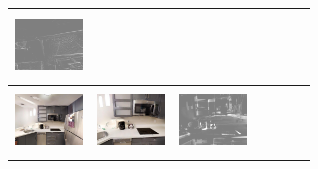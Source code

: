\documentclass[letterpaper, 10 pt, conference]{ieeeconf}  %
\begin{document}
\begin{figure}[h!]
\begin{center}
\begin{tabular}{|c| c |c | c | c | c | c|}
 \includegraphics[width=18mm, height=17mm]{FlowDepth/PABLO/ferror.png} 
 \\ \hline
\includegraphics[width=18mm, height=17mm]{TrueDepth/EUDORA/init.png} &   
            \includegraphics[width=18mm, height=17mm]{TrueDepth/EUDORA/des.png} &
           \includegraphics[width=18mm, height=17mm]{PhotoVS/EUDORA/ferror.png} & 


\end{tabular}
\end{center}
\end{figure}
\end{document}

